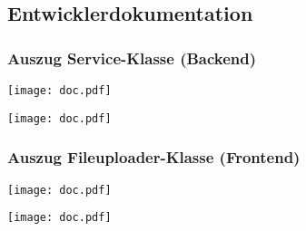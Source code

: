 \subsection{Entwicklerdokumentation}
\label{app:Doc}

\subsubsection*{Auszug Service-Klasse (Backend)}

\begin{center}
	\texttt{[image: doc.pdf]}
	
	\texttt{[image: doc.pdf]}
\end{center}

\subsubsection*{Auszug Fileuploader-Klasse (Frontend)}

\begin{center}
	\texttt{[image: doc.pdf]}
	
	\texttt{[image: doc.pdf]}
\end{center}
 
 